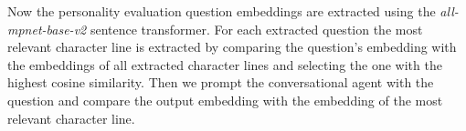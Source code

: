 \documentclass[fleqn,moreauthors,10pt]{ds_report}
\begin{document}
Now the personality evaluation question embeddings are extracted using the \textit{all-mpnet-base-v2} sentence transformer. For each extracted question the most relevant character line is extracted by comparing the question's embedding with the embeddings of all extracted character lines and selecting the one with the highest cosine similarity. Then we prompt the conversational agent with the question and compare the output embedding with the embedding of the most relevant character line.












\end{document}
